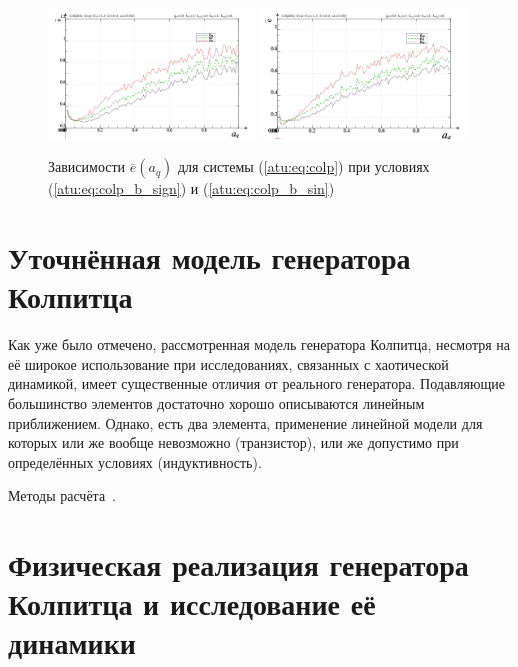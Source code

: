 \begin{figure}[htb!]
\centerline{
  \includegraphics[width=0.49\textwidth]{p/mod/colp_m5p-p_a_q_e_sign.png}
  \includegraphics[width=0.49\textwidth]{p/mod/colp_m5p-p_a_q_e_sin.png}
}
  \caption{Зависимости  $\overline{e}(a_q)$ для системы (\ref{atu:eq:colp})
  при условиях (\ref{atu:eq:colp_b_sign}) и (\ref{atu:eq:colp_b_sin})
}
\label{atu:f:colp_e_a_q}
\end{figure}




\section{Уточнённая модель генератора Колпитца}  %

Как уже было отмечено,
рассмотренная  модель
генератора Колпитца, несмотря на её широкое использование
при исследованиях, связанных с хаотической динамикой,
имеет существенные отличия от реального генератора.
Подавляющие большинство элементов достаточно хорошо описываются линейным
приближением. Однако, есть два элемента,
применение линейной модели для которых или же вообще невозможно (транзистор),
или же допустимо при определённых условиях (индуктивность).

Методы расчёта~\cite{zaeplnii_radio_calc}.


\section{Физическая реализация генератора Колпитца и исследование её динамики} %


